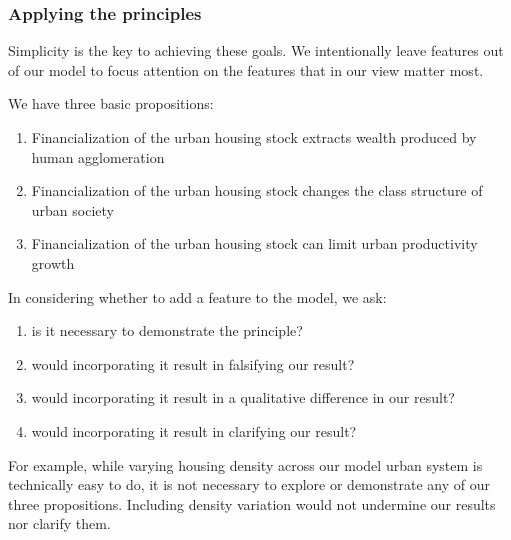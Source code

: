 \subsubsection{Applying the principles}
Simplicity is the key to achieving these goals. %
We intentionally leave features out of  our model to focus attention on the features that in our view matter most. 


We have three basic propositions:
\begin{enumerate}
    \item Financialization of the urban housing stock extracts wealth produced by human agglomeration 
    \item Financialization of the urban housing stock changes the class structure of urban society
    \item Financialization of the urban housing stock can limit urban productivity growth
\end{enumerate}
In considering whether to add a feature to the model, we ask: %
\begin{enumerate}
    \item is it necessary to demonstrate the principle? 
    \item would incorporating it result in falsifying our result?
    \item would incorporating it result in a qualitative difference in our result?
    \item would incorporating it result in clarifying our result?
\end{enumerate}

For example, %
while varying housing density across our model urban system is technically easy to do, it is not necessary to explore or demonstrate any of our three propositions. Including density variation would not undermine our results nor clarify them. %

